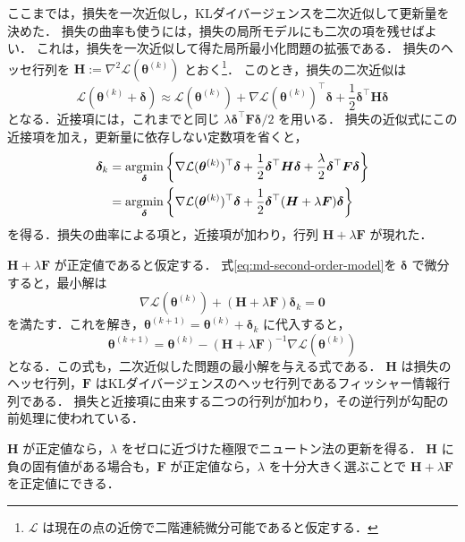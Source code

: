 \documentclass[../main.tex]{subfiles}
\begin{document}
ここまでは，損失を一次近似し，KLダイバージェンスを二次近似して更新量を決めた．
損失の曲率も使うには，損失の局所モデルにも二次の項を残せばよい．
これは，損失を一次近似して得た局所最小化問題の拡張である．
損失のヘッセ行列を $\bm{H}:=\nabla^2\mathcal{L}(\bm{\theta}^{(k)})$ とおく\footnote{$\mathcal{L}$ は現在の点の近傍で二階連続微分可能であると仮定する．}．
このとき，損失の二次近似は
\begin{equation}
  \mathcal{L}(\bm{\theta}^{(k)}+\bm{\delta})
  \approx \mathcal{L}(\bm{\theta}^{(k)})+\nabla \mathcal{L}(\bm{\theta}^{(k)})^\top\bm{\delta}
  +\frac12\bm{\delta}^\top \bm{H}\bm{\delta}
\end{equation}
となる．近接項には，これまでと同じ $\lambda\bm{\delta}^\top \bm{F}\bm{\delta}/2$ を用いる．
損失の近似式にこの近接項を加え，更新量に依存しない定数項を省くと，
\begin{align}
  \bm{\delta}_k
  &=\underset{\bm{\delta}}{\operatorname{argmin}}
  \left\{\nabla \mathcal{L}(\bm{\theta}^{(k)})^\top\bm{\delta}
  +\frac12\bm{\delta}^\top \bm{H}\bm{\delta}
  +\frac{\lambda}{2}\bm{\delta}^\top \bm{F}\bm{\delta}\right\}\notag\\
  &=\underset{\bm{\delta}}{\operatorname{argmin}}
  \left\{\nabla \mathcal{L}(\bm{\theta}^{(k)})^\top\bm{\delta}
  +\frac12\bm{\delta}^\top(\bm{H}+\lambda \bm{F})\bm{\delta}\right\}
  \label{eq:md-second-order-model}
\end{align}
を得る．損失の曲率による項と，近接項が加わり，行列 $\bm{H}+\lambda \bm{F}$ が現れた．

$\bm{H}+\lambda \bm{F}$ が正定値であると仮定する．
式\eqref{eq:md-second-order-model}を $\bm{\delta}$ で微分すると，最小解は
\begin{equation}
  \nabla \mathcal{L}(\bm{\theta}^{(k)})+(\bm{H}+\lambda \bm{F})\bm{\delta}_k=\bm{0}
\end{equation}
を満たす．これを解き，$\bm{\theta}^{(k+1)}=\bm{\theta}^{(k)}+\bm{\delta}_k$ に代入すると，
\begin{equation}
  \bm{\theta}^{(k+1)}
  =\bm{\theta}^{(k)}-(\bm{H}+\lambda \bm{F})^{-1}\nabla \mathcal{L}(\bm{\theta}^{(k)})
  \label{eq:md-second-order-update}
\end{equation}
となる．この式も，二次近似した問題の最小解を与える式である．
$\bm{H}$ は損失のヘッセ行列，$\bm{F}$ はKLダイバージェンスのヘッセ行列であるフィッシャー情報行列である．
損失と近接項に由来する二つの行列が加わり，その逆行列が勾配の前処理に使われている．

$\bm{H}$ が正定値なら，$\lambda$ をゼロに近づけた極限でニュートン法の更新を得る．
$\bm{H}$ に負の固有値がある場合も，$\bm{F}$ が正定値なら，$\lambda$ を十分大きく選ぶことで $\bm{H}+\lambda \bm{F}$ を正定値にできる．
\end{document}
